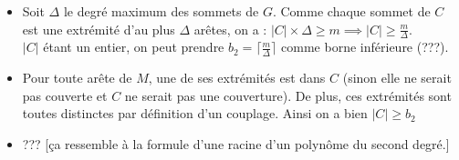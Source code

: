 \documentclass[12pt]{article}
\begin{document}
        \begin{itemize}
            \item Soit $\Delta$ le degré maximum des sommets de $G$. Comme chaque sommet de $C$ est une extrémité d'au plus $\Delta$ arêtes, on a : $|C| \times \Delta \geq m \implies |C| \geq \frac{m}{\Delta}$. \\
            $|C|$ étant un entier, on peut prendre $b_2 = \lceil \frac{m}{\Delta} \rceil$ comme borne inférieure (???). 
            \item Pour toute arête de $M$, une de ses extrémités est dans $C$ (sinon elle ne serait pas couverte et $C$ ne serait pas une couverture). De plus, ces extrémités sont toutes distinctes par définition d'un couplage. Ainsi on a bien $\boxed{|C| \geq b_2}$
            \item ??? [ça ressemble à la formule d'une racine d'un polynôme du second degré.]
        \end{itemize}
\end{document}
